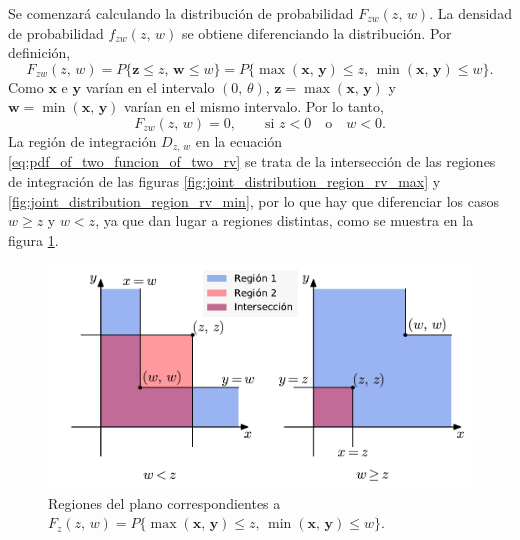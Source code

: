 \documentclass[a4paper]{report}
\newcommand{\x}{\mathbf{x}}
\newcommand{\y}{\mathbf{y}}
\newcommand{\w}{\mathbf{w}}
\newcommand{\z}{\mathbf{z}}
\begin{document}
Se comenzará calculando la distribución de probabilidad \(F_{zw}(z,\,w)\). La densidad de probabilidad \(f_{zw}(z,\,w)\) se obtiene diferenciando la distribución. Por definición,
\[
 F_{zw}(z,\,w)=P\{\z\leq z,\,\w\leq w\}=P\{\max(\x,\,\y)\leq z,\,\min(\x,\,\y)\leq w\}.
\]
Como \(\x\) e \(\y\) varían en el intervalo \((0,\,\theta)\), \(\z=\max(\x,\,\y)\) y \(\w=\min(\x,\,\y)\) varían en el mismo intervalo. Por lo tanto,
\[
 F_{zw}(z,\,w)=0, \qquad\textrm{si }z<0\quad\textrm{o}\quad w<0.
\]
La región de integración \(D_{z,\,w}\) en la ecuación \ref{eq:pdf_of_two_funcion_of_two_rv} se trata de la intersección de las regiones de integración de las figuras \ref{fig:joint_distribution_region_rv_max} y \ref{fig:joint_distribution_region_rv_min}, por lo que hay que diferenciar los casos \(w\geq z\) y \(w<z\), ya que dan lugar a regiones distintas, como se muestra en la figura \ref{fig:joint_distribution_region_rv_min_max}.
\begin{figure}[!htb]
\begin{center}
 \includegraphics[width=0.70\columnwidth]{figuras/joint_distribution_region_rv_min_max.pdf}
\caption{\label{fig:joint_distribution_region_rv_min_max} Regiones del plano correspondientes a \(F_z(z,\,w)=P\{\max(\x,\,\y)\leq z,\,\min(\x,\,\y)\leq w\}\).}
\end{center}
\end{figure}
\end{document}
